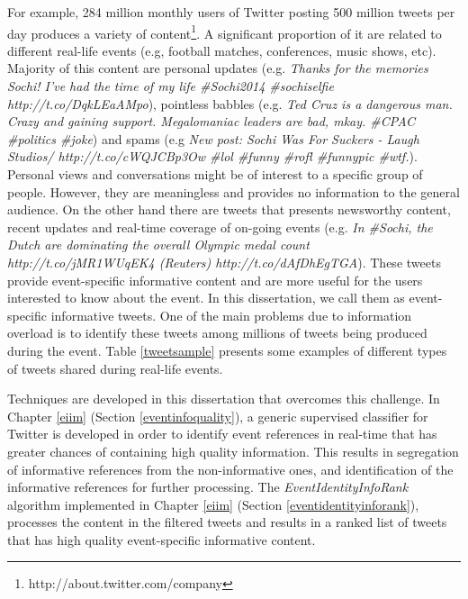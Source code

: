 For example, 284 million monthly users of Twitter posting 500 million tweets per day produces a variety of content\footnote{http://about.twitter.com/company}. A significant proportion of it are related to different real-life events (e.g, football matches, conferences, music shows, etc). Majority of this content are personal updates (e.g.  \textit{Thanks for the memories Sochi! I've had the time of my life \#Sochi2014 \#sochiselfie http://t.co/DqkLEaAMpo}), pointless babbles (e.g. \textit{Ted Cruz is a dangerous man. Crazy and gaining support. Megalomaniac leaders are bad, mkay. \#CPAC \#politics \#joke}) and spams (e.g \textit{New post: Sochi Was For Suckers - Laugh Studios/ http://t.co/cWQJCBp3Ow \#lol \#funny \#rofl \#funnypic \#wtf.}). Personal views and conversations might be of interest to a specific group of people. However, they are meaningless and provides no information to the general audience. On the other hand there are tweets that presents newsworthy content, recent updates and real-time coverage of on-going events (e.g. \textit{In \#Sochi, the Dutch are dominating the overall Olympic medal count http://t.co/jMR1WUqEK4 (Reuters) http://t.co/dAfDhEgTGA}). These tweets provide event-specific informative content and are more useful for the users interested to know about the event. In this dissertation, we call them as event-specific informative tweets. One of the main problems due to information overload is to identify these tweets among millions of tweets being produced during the event. Table \ref{tweetsample} presents some examples of different types of tweets shared during real-life events.

Techniques are developed in this dissertation that overcomes this challenge. In Chapter \ref{eiim} (Section \ref{eventinfoquality}), a generic supervised classifier for Twitter is developed in order to identify event references in real-time that has greater chances of containing high quality information. This results in segregation of informative references from the non-informative ones, and identification of the informative references for further processing. The \textit{EventIdentityInfoRank} algorithm implemented in Chapter \ref{eiim} (Section \ref{eventidentityinforank}), processes the content in the filtered tweets and results in a ranked list of tweets that has high quality event-specific informative content. 

